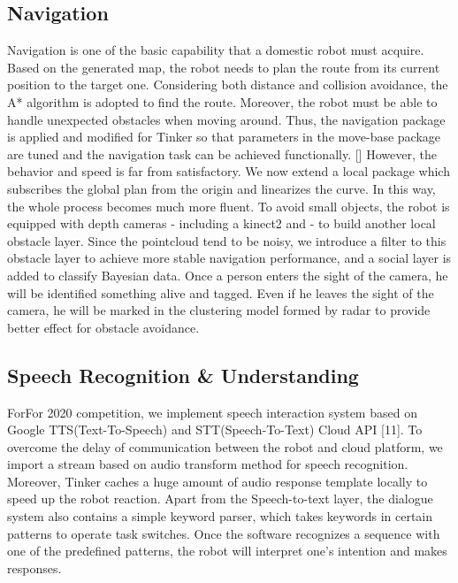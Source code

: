 \documentclass[runningheads,UTF8,fntef,a4paper]{llncs}
\begin{document}
\subsection{Navigation}
Navigation is one of the basic capability that a domestic robot must acquire. Based on the generated map, the robot needs to plan the route from its current position to the target one. Considering both distance and collision avoidance, the A* algorithm is adopted to find the route. Moreover, the robot must be able to handle unexpected obstacles when moving around. Thus, the navigation package is applied and modified for Tinker so that parameters in the move-base package are tuned and the navigation task can be achieved functionally. [] However, the behavior and speed is far from satisfactory. We now extend a local package which subscribes the global plan from the origin and linearizes the curve. In this way, the whole process becomes much more fluent. To avoid small objects, the robot is equipped with depth cameras - including a kinect2 and - to build another local obstacle layer. Since the pointcloud tend to be noisy, we introduce a filter to this obstacle layer to achieve more stable navigation performance, and a social layer is added to classify Bayesian data. Once a person enters the sight of the camera, he will be identified something alive and tagged. Even if he leaves the sight of the camera, he will be marked in the clustering model formed by radar to provide better eﬀect for obstacle avoidance.

\subsection{Speech Recognition \& Understanding}
ForFor 2020 competition, we implement speech interaction system based on Google TTS(Text-To-Speech) and STT(Speech-To-Text) Cloud API [11]. To overcome the delay of communication between the robot and cloud platform, we import a stream based on audio transform method for speech recognition. Moreover, Tinker caches a huge amount of audio response template locally to speed up the robot reaction.
Apart from the Speech-to-text layer, the dialogue system also contains a simple keyword parser, which takes keywords in certain patterns to operate task switches. Once the software recognizes a sequence with one of the predefined patterns, the robot will interpret one’s intention and makes responses.
\end{document}
